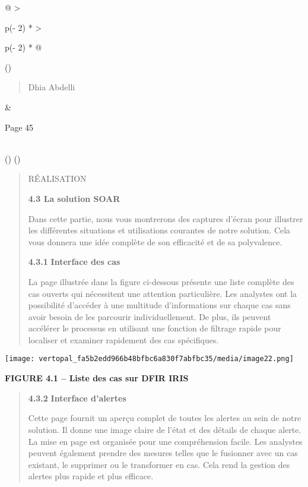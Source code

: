 \documentclass[
]{article}
\begin{document}
\begin{longtable}[]{@{}
  >{\raggedright\arraybackslash}p{(\columnwidth - 2\tabcolsep) * }
  >{\raggedright\arraybackslash}p{(\columnwidth - 2\tabcolsep) * }@{}}
\toprule()
\begin{minipage}[b]{\linewidth}\raggedright
\begin{quote}
Dhia Abdelli
\end{quote}
\end{minipage} & \begin{minipage}[b]{\linewidth}\raggedright
Page 45
\end{minipage} \\
\midrule()
\endhead
\bottomrule()
\end{longtable}

\begin{quote}
RÉALISATION

\textbf{4.3 La solution SOAR}

Dans cette partie, nous vous montrerons des captures d'écran pour
illustrer les différentes situations et utilisations courantes de notre
solution. Cela vous donnera une idée complète de son efficacité et de sa
polyvalence.

\textbf{4.3.1} \textbf{Interface des cas}

La page illustrée dans la figure ci-dessous présente une liste complète
des cas ouverts qui nécessitent une attention particulière. Les
analystes ont la possibilité d'accéder à une multitude d'informations
sur chaque cas sans avoir besoin de les parcourir individuellement. De
plus, ils peuvent accélérer le processus en utilisant une fonction de
filtrage rapide pour localiser et examiner rapidement des cas
spécifiques.
\end{quote}

\texttt{[image: vertopal\_fa5b2edd966b48bfbc6a830f7abfbc35/media/image22.png]}

\textbf{FIGURE 4.1 -- Liste des cas sur DFIR IRIS}

\begin{quote}
\textbf{4.3.2} \textbf{Interface d'alertes}

Cette page fournit un aperçu complet de toutes les alertes au sein de
notre solution. Il donne une image claire de l'état et des détails de
chaque alerte. La mise en page est organisée pour une compréhension
facile. Les analystes peuvent également prendre des mesures telles que
le fusionner avec un cas existant, le supprimer ou le transformer en
cas. Cela rend la gestion des alertes plus rapide et plus efficace.
\end{quote}
\end{document}
